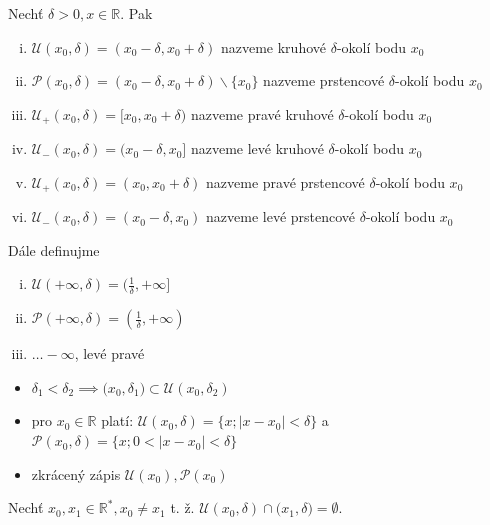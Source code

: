 \begin{definice}
  Nechť $\delta > 0, x \in \mathbb R$. Pak
  \begin{enumerate}[i.]
    \item $\mathscr U (x_0, \delta) = (x_0 - \delta, x_0 + \delta)$ nazveme kruhové $\delta$-okolí bodu $x_0$
    \item $\mathscr P (x_0, \delta) = (x_0 - \delta, x_0 + \delta) \smallsetminus \{x_0\}$ nazveme prstencové $\delta$-okolí bodu $x_0$
    \item $\mathscr U_+ (x_0, \delta) = [x_0, x_0 + \delta)$ nazveme pravé kruhové $\delta$-okolí bodu $x_0$
    \item $\mathscr U_- (x_0, \delta) = (x_0 - \delta, x_0]$ nazveme levé kruhové $\delta$-okolí bodu $x_0$
    \item $\mathscr U_+ (x_0, \delta) = (x_0, x_0 + \delta)$ nazveme pravé prstencové $\delta$-okolí bodu $x_0$
    \item $\mathscr U_- (x_0, \delta) = (x_0 - \delta, x_0)$ nazveme levé prstencové $\delta$-okolí bodu $x_0$
  \end{enumerate}
Dále definujme
  \begin{enumerate}[i.]
    \item $\mathscr U (+\infty, \delta) = (\frac{1}{\delta}, +\infty]$
    \item $\mathscr P (+\infty, \delta) = (\frac{1}{\delta}, +\infty)$
    \item $\dots -\infty$, levé pravé
  \end{enumerate}
\end{definice}

\begin{poznamka}
  \begin{itemize}
    \item $\delta_1 < \delta_2 \implies \mathscr (x_0, \delta_1) \subset \mathscr U (x_0, \delta_2)$
    \item pro $x_0 \in \mathbb R$ platí: $\mathscr U (x_0, \delta) = \{x; |x-x_0| < \delta\}$ a $\mathscr P (x_0, \delta) = \{x; 0 < |x-x_0| < \delta\}$
    \item zkrácený zápis $\mathscr U(x_0), \mathscr P(x_0)$
  \end{itemize}
\end{poznamka}

\begin{veta}
  Nechť $x_0, x_1 \in \mathbb R^*, x_0 \neq x_1$ t. ž. $\mathscr U (x_0, \delta) \cap \mathscr (x_1, \delta) = \emptyset$.
\end{veta}

